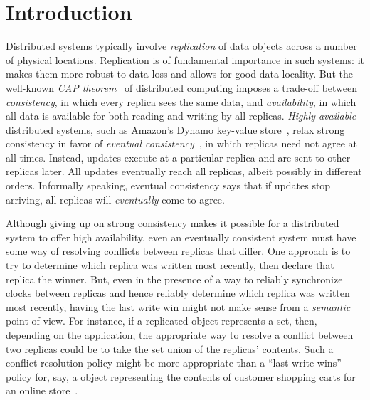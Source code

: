 \section{Introduction}\label{s:intro}


Distributed systems typically involve \emph{replication} of data
objects across a number of physical locations.  Replication is of
fundamental importance in such systems: it makes them more
robust to data loss and allows for good data locality.
But the well-known \emph{CAP
  theorem}~\cite{gilbert-lynch-cap,BrewerCAPBlog} of distributed
computing imposes a trade-off between \emph{consistency}, in which
every replica sees the same data, and \emph{availability}, in
which all data is available for both reading and writing by all
replicas.
\emph{Highly available} distributed systems, such as
Amazon's Dynamo key-value store~\cite{dynamo}, relax strong
consistency in favor of \emph{eventual consistency}~\cite{vogels-ec},
in which replicas
need not agree at all times.  Instead, updates execute at a particular
replica and are sent to other replicas later. All updates eventually
reach all replicas, albeit possibly in different orders.  Informally
speaking, eventual consistency says that
if updates stop
arriving, all replicas will \emph{eventually} come to agree.

Although giving up on strong consistency makes it possible for a
distributed system to offer high availability, even an eventually
consistent system must have some way of resolving
conflicts between replicas that differ.  One approach is to
try to determine which replica
was written most recently, then declare that replica the
winner.  But, even in the presence of a 
way to reliably synchronize clocks between replicas and hence
reliably determine which replica was written most recently, having the
last write win might not make sense from a \emph{semantic} point of
view.
For instance, if a replicated object represents a set, then, depending
on the application, the appropriate way to resolve a conflict between
two replicas could be to take the set union of the replicas' contents.
Such a conflict resolution policy might be more appropriate than a ``last
write wins'' policy for, say, a object representing the contents of
customer shopping carts for an online store~\cite{dynamo}.

